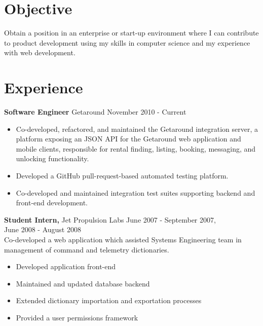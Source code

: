 \documentclass[margin]{res}
\begin{document}
 
 
\address{{\bf Current Address} \\ 1355 Harrison St.\\ San Francisco, CA 94103}
\address{{\bf Contact Information} \\ Mobile: (760) 994-9051\\Email: \space michael@mvanveen.net}
\begin{resume} 
 
\section{Objective}
Obtain a position in an enterprise or start-up environment where I can contribute to product development using my skills in computer science and my experience with web development.

\section{Experience}
  {\bf Software Engineer} Getaround \hfill November 2010 - Current \\
  \begin{itemize}
    Backend-focused Software Engineer and former intern at Getaround.
    \item Co-developed, refactored, and maintained the Getaround integration server, a platform exposing an JSON API for the Getaround web application and mobile clients, responsible for rental finding, listing, booking, messaging, and unlocking functionality.
    \item Developed a GitHub pull-request-based automated testing platform. \\
    \item Co-developed and maintained integration test suites supporting backend and front-end development. \\
  \end{itemize}

 {\bf Student Intern,} Jet Propulsion Labs \hfill June 2007 - September 2007, \\
 \makebox[2.9in]{\hfill} June 2008 - August 2008 \\ 
 Co-developed a web application which assisted Systems Engineering team in management of command and telemetry dictionaries.
 \begin{itemize}
 \item Developed application front-end
 \item Maintained and updated database backend
 \item Extended dictionary importation and exportation processes
 \item Provided a user permissions framework
 \end{itemize} 


\end{resume}
\end{document}
